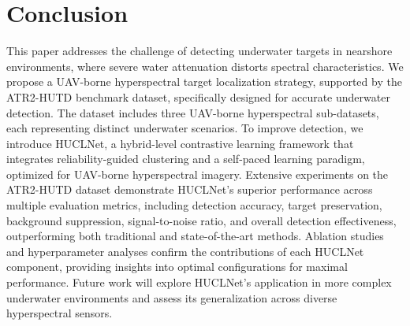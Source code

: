 \section{Conclusion} \label{sec:6}
This paper addresses the challenge of detecting underwater targets in nearshore environments, where severe water attenuation distorts spectral characteristics. We propose a UAV-borne hyperspectral target localization strategy, supported by the ATR2-HUTD benchmark dataset, specifically designed for accurate underwater detection. The dataset includes three UAV-borne hyperspectral sub-datasets, each representing distinct underwater scenarios.
To improve detection, we introduce HUCLNet, a hybrid-level contrastive learning framework that integrates reliability-guided clustering and a self-paced learning paradigm, optimized for UAV-borne hyperspectral imagery.
Extensive experiments on the ATR2-HUTD dataset demonstrate HUCLNet's superior performance across multiple evaluation metrics, including detection accuracy, target preservation, background suppression, signal-to-noise ratio, and overall detection effectiveness, outperforming both traditional and state-of-the-art methods.
Ablation studies and hyperparameter analyses confirm the contributions of each HUCLNet component, providing insights into optimal configurations for maximal performance. Future work will explore HUCLNet's application in more complex underwater environments and assess its generalization across diverse hyperspectral sensors.


